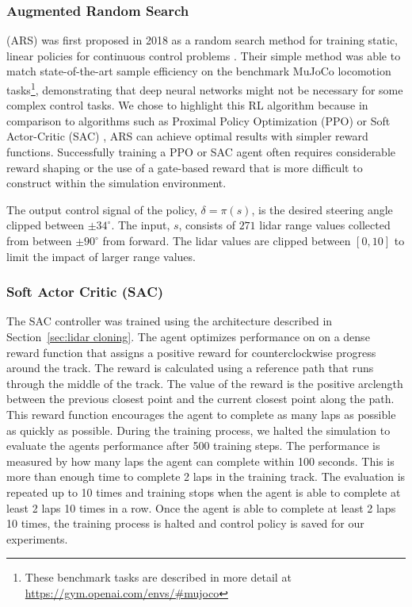 \documentclass[manuscript,screen,review]{acmart}
\begin{document}
\subsubsection{Augmented Random Search} 
(ARS) was first proposed in 2018 as a random search method for training static, linear policies for continuous control problems \cite{mania2018simple}. Their simple method was able to match state-of-the-art sample efficiency on the benchmark MuJoCo locomotion tasks\footnote{These benchmark tasks are described in more detail at \url{https://gym.openai.com/envs/\#mujoco}}, demonstrating that deep neural networks might not be necessary for some complex control tasks. We chose to highlight this RL algorithm because in comparison to algorithms such as Proximal Policy Optimization (PPO) \cite{schulman2017proximal} or Soft Actor-Critic (SAC) \cite{haarnoja2018soft}, ARS can achieve optimal results with simpler reward functions. Successfully training a PPO or SAC agent often requires considerable reward shaping or the use of a gate-based reward that is more difficult to construct within the simulation environment.

The output control signal of the policy, $\delta = \pi(s)$, is the desired steering angle clipped between $\pm 34^{\circ}$. The input, $s$, consists of $271$ lidar range values collected from between $\pm90^{\circ}$ from forward. The lidar values are clipped between $[0, 10]$ to limit the impact of larger range values.

\subsubsection{Soft Actor Critic (SAC)}
The SAC controller was trained
using the architecture described in Section~\ref{sec:lidar cloning}. The agent optimizes performance on on a dense reward function that assigns a positive reward for counterclockwise progress around the track. The reward is calculated using a reference path that runs through the middle of the track. The value of the reward is the positive arclength between the previous closest point and the current closest point along the path. This reward function encourages the agent to complete as many laps as possible as quickly as possible. During the training process, we halted the simulation to evaluate the agents performance after 500 training steps. The performance is measured by how many laps the agent can complete within 100 seconds. This is more than enough time to complete 2 laps in the training track. The evaluation is repeated up to 10 times and training stops when the agent is able to complete at least 2 laps 10 times in a row. Once the agent is able to complete at least 2 laps 10 times, the training process is halted and control policy is saved for our experiments.
\end{document}
